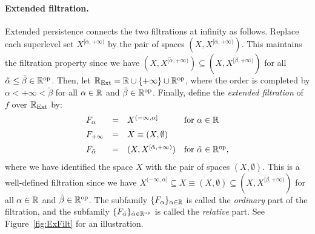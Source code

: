 \paragraph*{Extended filtration.} Extended persistence connects the two filtrations at infinity as
follows. Replace each superlevel set $X^{[\tilde\alpha, +\infty)}$ by
the pair of spaces $(X, X^{[\tilde\alpha, +\infty)})$. This maintains the filtration property since we have
$(X, X^{[\tilde\alpha, +\infty)})\subseteq (X, X^{[\tilde\beta,+\infty)})$ for all
$\tilde\alpha\leq\tilde\beta\in\mathbb{R}^{\text{op}}$. Then, let
$\mathbb{R}_{\text{Ext}}=\mathbb{R}\cup\{+\infty\}\cup\mathbb{R}^{\text{op}}$, where the order is
completed by $\alpha<+\infty<\tilde{\beta}$ for all
$\alpha\in\mathbb{R}$ and $\tilde\beta\in\mathbb{R}^{\text{op}}$. %
Finally, define the {\em extended filtration} of $f$ over $\mathbb{R}_{\text{Ext}}$ by:
%
\[
\begin{array}{llll}
F_\alpha &=& X^{(-\infty, \alpha]} & \mbox{for $\alpha\in\mathbb{R}$}\\[0.5em]
F_{+\infty} &=& X \equiv (X,\emptyset)\\[0.5em]
F_{\tilde\alpha} &=& (X, X^{[\tilde\alpha, +\infty)}) & \mbox{for $\tilde\alpha\in\mathbb{R}^{\text{op}}$},
\end{array}
\]
%
where we have identified the space $X$ with the pair of spaces $(X,\emptyset)$. 
This is a well-defined filtration since we have
$X^{(-\infty, \alpha]}\subseteq X \equiv (X, \emptyset) \subseteq (X,X^{[\tilde\beta, +\infty)})$ 
for all $\alpha\in\mathbb{R}$ and $\tilde\beta\in\mathbb{R}^{\text{op}}$.  The subfamily $\{F_\alpha\}_{\alpha\in\mathbb{R}}$ is
called the {\em ordinary} part of the filtration, and the
subfamily $\{F_{\tilde\alpha}\}_{\tilde\alpha\in\mathbb{R}^{\text{op}}}$ is called the
{\em relative} part. See Figure~\ref{fig:ExFilt} for an illustration.

